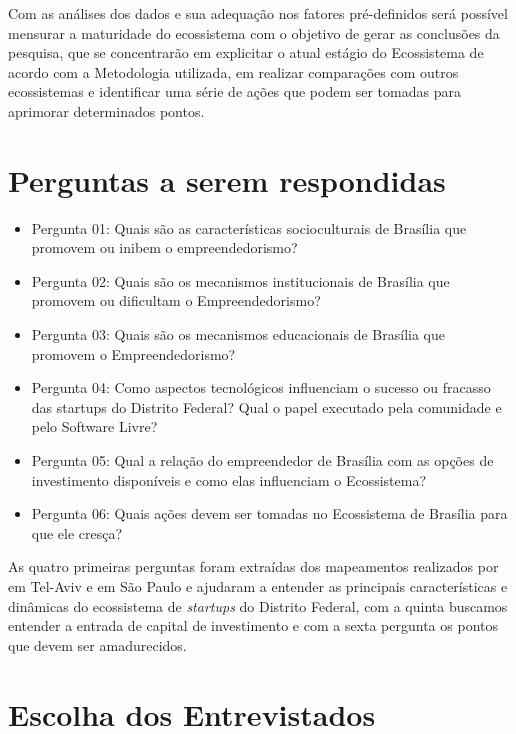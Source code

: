 Com as análises dos dados e sua adequação nos fatores pré-definidos será possível mensurar a maturidade do ecossistema com o objetivo de gerar as conclusões da pesquisa, que se concentrarão em explicitar o atual estágio do Ecossistema de acordo com a Metodologia utilizada, em realizar comparações com outros ecossistemas e identificar uma série de ações que podem ser tomadas para aprimorar determinados pontos.

\section{Perguntas a serem respondidas}
\label{subsection:questoes_de_pesquisa}

\begin{itemize}
  \item Pergunta 01: Quais são as características socioculturais de Brasília que promovem ou inibem o empreendedorismo?
  \item Pergunta 02: Quais são os mecanismos institucionais de Brasília que promovem ou dificultam o Empreendedorismo?
  \item Pergunta 03: Quais são os mecanismos educacionais de Brasília que promovem o Empreendedorismo?
  \item Pergunta 04: Como aspectos tecnológicos influenciam o sucesso ou fracasso das startups do Distrito Federal? Qual o papel executado pela comunidade e pelo Software Livre?
  \item Pergunta 05: Qual a relação do empreendedor de Brasília com as opções de investimento disponíveis e como elas influenciam o Ecossistema?
  \item Pergunta 06: Quais ações devem ser tomadas no Ecossistema de Brasília para que ele cresça?
\end{itemize}

As quatro primeiras perguntas foram extraídas dos mapeamentos realizados por  em Tel-Aviv e  em São Paulo e ajudaram a entender as principais características e dinâmicas do ecossistema de \textit{startups} do Distrito Federal, com a quinta buscamos entender a entrada de capital de investimento e com a sexta pergunta os pontos que devem ser amadurecidos.

\section{Escolha dos Entrevistados}
\label{subsection:escolha_dos_entrevistados}


